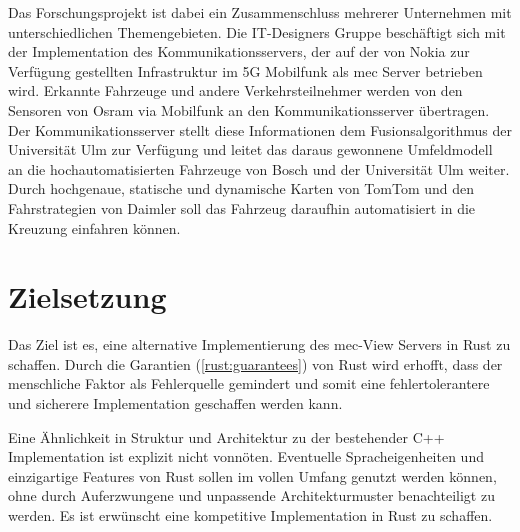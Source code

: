 Das Forschungsprojekt ist dabei ein Zusammenschluss mehrerer Unternehmen mit unterschiedlichen Themengebieten.
Die IT-Designers Gruppe beschäftigt sich mit der Implementation des Kommunikationsservers, der auf der von Nokia zur Verfügung gestellten Infrastruktur im 5G Mobilfunk als \gls{mec} Server betrieben wird.
Erkannte Fahrzeuge und andere Verkehrsteilnehmer werden von den Sensoren von Osram via Mobilfunk an den Kommunikationsserver übertragen.
Der Kommunikationsserver stellt diese Informationen dem Fusionsalgorithmus der Universität Ulm zur Verfügung und leitet das daraus gewonnene Umfeldmodell an die hochautomatisierten Fahrzeuge von Bosch und der Universität Ulm weiter.
Durch hochgenaue, statische und dynamische Karten von TomTom und den Fahrstrategien von Daimler soll das Fahrzeug daraufhin automatisiert in die Kreuzung einfahren können.



\section{Zielsetzung}

Das Ziel ist es, eine alternative Implementierung des \gls{mec}-View Servers in Rust zu schaffen.
Durch die Garantien (\autoref{rust:guarantees}) von Rust wird erhofft, dass der menschliche Faktor als Fehlerquelle gemindert und somit eine fehlertolerantere und sicherere Implementation geschaffen werden kann.

Eine Ähnlichkeit in Struktur und Architektur zu der bestehender C++ Implementation ist explizit nicht vonnöten.
Eventuelle Spracheigenheiten und einzigartige Features von Rust sollen im vollen Umfang genutzt werden können, ohne durch Auferzwungene und unpassende Architekturmuster benachteiligt zu werden.
Es ist erwünscht eine kompetitive Implementation in Rust zu schaffen.


